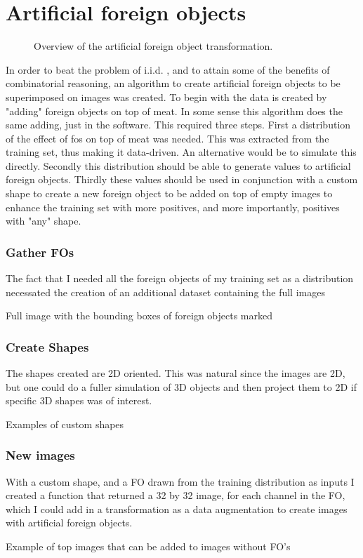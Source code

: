 \section{Artificial foreign objects}
\begin{figure*}[t]
\missingfigure{}
\caption{Overview of the artificial foreign object transformation.}
\label{fig.AFO_process}
\end{figure*}
In order to beat the problem of i.i.d. , and to attain some of the benefits of combinatorial reasoning, an algorithm to create artificial foreign objects to be superimposed on images was created. 
To begin with the data is created by "adding" foreign objects on top of meat.  In some sense this algorithm does the same adding, just in the software.
This required three steps.
First a distribution of the effect of fos on top of meat was needed. This was extracted from the training set, thus making it data-driven. An alternative would be to simulate this directly.
Secondly this distribution should be able to generate values to artificial foreign objects.
Thirdly these values should be used in conjunction with a custom shape to create a new foreign object to be added on top of empty images to enhance the training set with more positives, and more importantly, positives with "any" shape.
\subsubsection{Gather FOs}
The fact that I needed all the foreign objects of my training set as a distribution necessated the creation of an additional dataset containing the full images
\begin{marginfigure}
  \missingfigure{}%
\caption{Full image with the bounding boxes of foreign objects marked}
\end{marginfigure} 
\subsubsection{Create Shapes}
The shapes created are 2D oriented. This was natural since the images are 2D, but one could do a fuller simulation of 3D objects and then project them to 2D if specific 3D shapes was of interest.
\begin{marginfigure}
  \missingfigure{}%
\caption{Examples of custom shapes}
\end{marginfigure} 
\subsubsection{New images}
With a custom shape, and a FO drawn from the training distribution as inputs I created a function that returned a 32 by 32 image, for each channel in the FO, which I could add in a transformation as a data augmentation to create images with artificial foreign objects.
\begin{marginfigure}
  \missingfigure{}%
\caption{Example of top images that can be added to images without FO's}
\end{marginfigure} 
